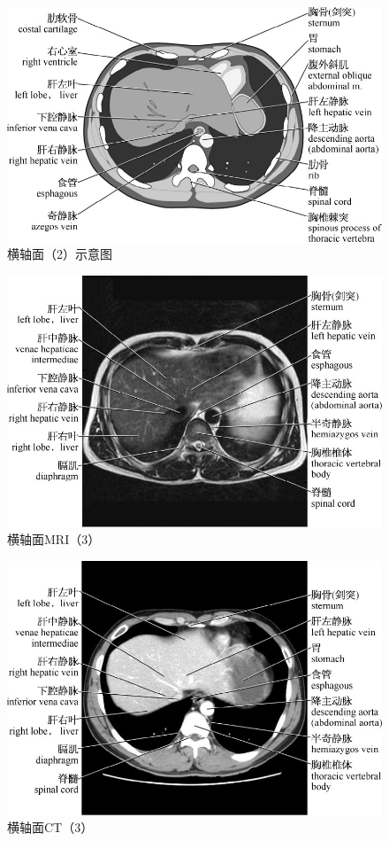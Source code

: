\begin{figure}[!htbp]
 \centering
 \includegraphics{./images/Image00007.jpg}
 \captionsetup{justification=centering}
 \caption{横轴面（2）示意图}
  \end{figure} 
 \FloatBarrier

\begin{figure}[!htbp]
 \centering
 \includegraphics{./images/Image00008.jpg}
 \captionsetup{justification=centering}
 \caption{横轴面MRI（3）}
  \end{figure} 
 \FloatBarrier

\begin{figure}[!htbp]
 \centering
 \includegraphics{./images/Image00009.jpg}
 \captionsetup{justification=centering}
 \caption{横轴面CT（3）}
  \end{figure} 
 \FloatBarrier

